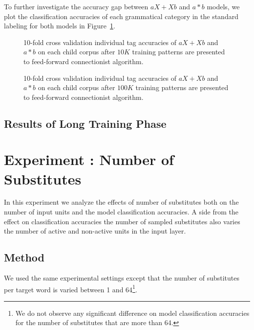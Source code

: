 To further investigate the accuracy gap between $aX+Xb$ and $a*b$ models, we
plot the classification accuracies of each grammatical category in the standard
labeling for both models in Figure~\ref{fig:category10K}.
\begin{figure}[h]
 \caption{10-fold cross validation individual tag accuracies of $aX+Xb$ and
  $a*b$ on each child corpus after $10K$ training patterns are presented to
  feed-forward connectionist algorithm.  }
  \label{fig:category10K}
\end{figure}

\begin{figure}[h]
  \caption{10-fold cross validation individual tag accuracies of $aX+Xb$ and
  $a*b$ on each child corpus after $100K$ training patterns are presented to
  feed-forward connectionist algorithm.  }
  \label{fig:category100K}
\end{figure}
\subsection{Results of Long Training Phase} 




\section{Experiment : Number of Substitutes}
\label{s:exp_substitutes}
In this experiment we analyze the effects of number of substitutes both on the
number of input units and the model classification accuracies.  A side from the
effect on classification accuracies the number of sampled substitutes also
varies the number of active and non-active units in the input layer.  

\subsection{Method} 
We used the same experimental settings except that the number of substitutes
per target word is varied between 1 and 64\footnote{We do not observe any
significant difference on model classification accuracies for the number of
substitutes that are more than 64.}.


